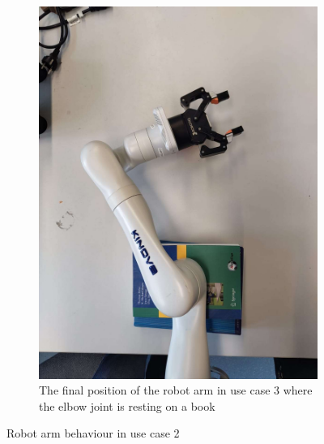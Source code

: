 \documentclass[report.tex]{subfiles}
\begin{document}
\begin{figure}[H]
\begin{subfigure}{0.5\textwidth}
            \centering
            \captionsetup[figure]{justification=centering}
            \includegraphics[width=\linewidth]{images/us3_final.jpg}
            \caption{The final position of the robot arm in use case 3 where the elbow joint is resting on a book}
            \label{fig:us3_end}
        \end{subfigure}
        \caption{Robot arm behaviour in use case 2}
    \end{figure}
\end{document}
